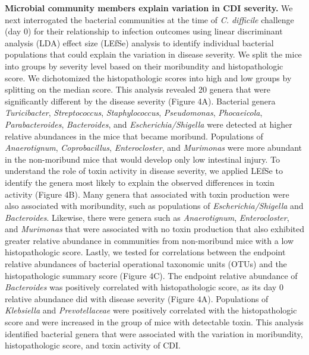 \documentclass[
  12pt,
]{article}
\begin{document}
\textbf{Microbial community members explain variation in CDI severity.}
We next interrogated the bacterial communities at the time of \emph{C.
difficile} challenge (day 0) for their relationship to infection
outcomes using linear discriminant analysis (LDA) effect size (LEfSe)
analysis to identify individual bacterial populations that could explain
the variation in disease severity. We split the mice into groups by
severity level based on their moribundity and histopathologic score. We
dichotomized the histopathologic scores into high and low groups by
splitting on the median score. This analysis revealed 20 genera that
were significantly different by the disease severity (Figure 4A).
Bacterial genera \emph{Turicibacter}, \emph{Streptococcus},
\emph{Staphylococcus}, \emph{Pseudomonas}, \emph{Phocaeicola},
\emph{Parabacteroides}, \emph{Bacteroides}, and
\emph{Escherichia/Shigella} were detected at higher relative abundances
in the mice that became moribund. Populations of \emph{Anaerotignum},
\emph{Coprobacillus}, \emph{Enterocloster}, and \emph{Murimonas} were
more abundant in the non-moribund mice that would develop only low
intestinal injury. To understand the role of toxin activity in disease
severity, we applied LEfSe to identify the genera most likely to explain
the observed differences in toxin activity (Figure 4B). Many genera that
associated with toxin production were also associated with moribundity,
such as populations of \emph{Escherichia/Shigella} and
\emph{Bacteroides}. Likewise, there were genera such as
\emph{Anaerotignum}, \emph{Enterocloster}, and \emph{Murimonas} that
were associated with no toxin production that also exhibited greater
relative abundance in communities from non-moribund mice with a low
histopathologic score. Lastly, we tested for correlations between the
endpoint relative abundances of bacterial operational taxonomic units
(OTUs) and the histopathologic summary score (Figure 4C). The endpoint
relative abundance of \emph{Bacteroides} was positively correlated with
histopathologic score, as its day 0 relative abundance did with disease
severity (Figure 4A). Populations of \emph{Klebsiella} and
\emph{Prevotellaceae} were positively correlated with the
histopathologic score and were increased in the group of mice with
detectable toxin. This analysis identified bacterial genera that were
associated with the variation in moribundity, histopathologic score, and
toxin activity of CDI.
\end{document}
